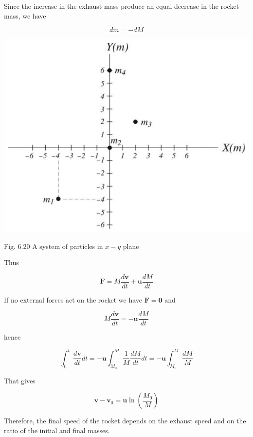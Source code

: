 \documentclass[10pt]{article}
\begin{document}
Since the increase in the exhaust mass produce an equal decrease in the rocket mass, we have

$$
d m=-d M
$$

\begin{center}
\includegraphics[max width=\textwidth]{2024_09_13_db1f357d2aad0a03eb2eg-108(2)}
\end{center}

Fig. 6.20 A system of particles in $x-y$ plane

Thus

$$
\mathbf{F}=M \frac{d \mathbf{v}}{d t}+\mathbf{u} \frac{d M}{d t}
$$

If no external forces act on the rocket we have $\mathbf{F}=\mathbf{0}$ and

$$
M \frac{d \mathbf{v}}{d t}=-\mathbf{u} \frac{d M}{d t}
$$

hence

$$
\int_{t_{0}}^{t} \frac{d \mathbf{v}}{d t} d t=-\mathbf{u} \int_{M_{0}}^{M} \frac{1}{M} \frac{d M}{d t} d t=-\mathbf{u} \int_{M_{0}}^{M} \frac{d M}{M}
$$

That gives

$$
\mathbf{v}-\mathbf{v}_{0}=\mathbf{u} \ln \left(\frac{M_{0}}{M}\right)
$$

Therefore, the final speed of the rocket depends on the exhaust speed and on the ratio of the initial and final masses.
\end{document}
